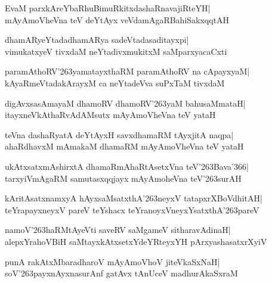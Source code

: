 \documentclass[twoside,12pt,openright]{book}
\def\S{\char'263}
\newcounter{shloka}[chapter]
\begin{document}
\begin{shloka}%
EvaM parxkAreYbaRhuBimuRkitxdashaRnavajiRteYH|\\
mAyAmoVheVna teV deYtAyx veVdamAgaRBahiSakxqqtAH
\end{shloka}

\begin{shloka}%
dhamARyeYtadadhamARya sadeVtadasaditayxpi|\\
vimukatxyeV tivxdaM neYtadivxmukitxM saMparxyacaCxti
\end{shloka}

\begin{shloka}%
paramAthoRV\S yamatayxthaRM paramAthoRV na cApayxyaM|\\
kAyaRmeVtadakArayxM ca neYtadeVva suPxTaM tivxdaM 
\end{shloka}

\begin{shloka}%
digAvxsasAmayaM dhamoRV dhamoRV\S yaM bahusaMmataH|\\
itayxneVkAthaRvAdAMsutx mAyAmoVheVna teV yataH
\end{shloka}

\begin{shloka}%
teVna dashaRyatA deYtAyxH savxdhamaRM tAyxjitA naqpa|\\
ahaRdhavxM mAmakaM dhamaRM mAyAmoVheVna teV yataH
\end{shloka}

\begin{shloka}%
ukAtxsatxmAshirxtA dhamaRmAhaRtAsetxVna teV\S Bava\char'366|\\
tarxyiVmAgaRM samutasxqqjayx mAyAmoheVna teV\S surAH
\end{shloka}

\begin{shloka}%
kAritAsatxnamxyA hAyxsaMsatxthA\S neyxV tatapxrXBoVdhitAH|\\
teYrapayxneyxV pareV teYshacx teYranoyxVneyxYsatxthA\S pareV
\end{shloka}

\begin{shloka}%
namoV\S haRMtAyeVti saveRV saMgameV sitharavAdinaH|\\
alepxYrahoVBiH saMtayxkAtxsetxYdeYRteyxYH pArxyashasatxrXyiV
\end{shloka}

\begin{shloka}%
punA rakAtxMbaradharoV mAyAmoVhoV jiteVkaSxNaH|\\
soV\S payxnAyxnasurAnf gatAvx tAnUceV madhurAkaSxraM
\end{shloka}
\end{document}
